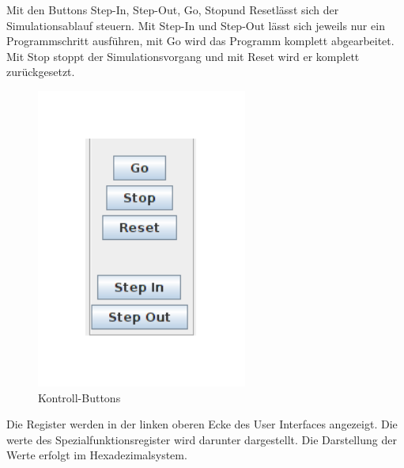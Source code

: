 \noindent Mit den Buttons \glqq Step-In\grqq , \glqq Step-Out\grqq , \glqq Go\grqq , \glqq Stop\grqq  und \glqq Reset\grqq  l\"asst sich der Simulationsablauf steuern. Mit Step-In und Step-Out l\"asst sich jeweils nur ein Programmschritt ausf\"uhren, mit Go wird das Programm komplett abgearbeitet. Mit Stop stoppt der Simulationsvorgang und mit Reset wird er komplett zur\"uckgesetzt.

\begin{figure}[h]
\centering
\includegraphics[scale=0.5]{Bilder/Buttons.pdf}
\caption{Kontroll-Buttons}
\end{figure}

Die Register werden in der linken oberen Ecke des User Interfaces angezeigt. Die werte des Spezialfunktionsregister wird darunter dargestellt. Die  Darstellung der Werte erfolgt im Hexadezimalsystem.

